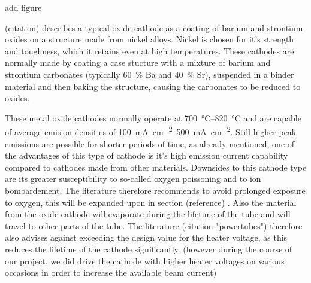 add figure 

(citation)  describes a typical oxide cathode as a coating of barium and strontium oxides on a structure made from nickel alloys. Nickel is chosen for it's strength and toughness, which it retains even at high temperatures. These cathodes are normally made by coating a case stucture with a mixture of barium and strontium carbonates (typically \SI{60}{\percent} Ba and \SI{40}{\percent} Sr), suspended in a binder material and then baking the structure, causing the carbonates to be reduced to oxides. 

These metal oxide cathodes normally operate at \SIrange{700}{820}{\celsius} and are capable of average emision densities of \SIrange{100}{500}{\milli\ampere\per\centi\meter\squared}. Still higher peak emissions are possible for shorter periods of time, as already mentioned, one of the advantages of this type of cathode is it's high emission current capability compared to cathodes made from other materials. Downsides to this cathode type are its greater susceptibility to so-called oxygen poissoning and to ion bombardement. The literature therefore recommends to avoid prolonged exposure to oxygen, this will be expanded upon in section (reference) . Also the material from the oxide cathode will evaporate during the lifetime of the tube and will travel to other parts of the tube. The literature (citation "powertubes") therefore also advises against exceeding the design value  for the heater voltage, as this reduces the lifetime of the cathode significantly. (however during the course of our project, we did drive the cathode with higher heater voltages on various occasions in order to increase the available beam current)













